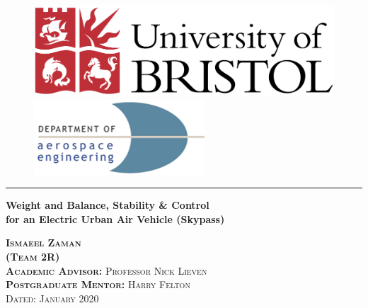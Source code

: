 \documentclass[11pt,a4paper]{article}
\begin{document}
\begin{titlepage}

\begin{figure}[H]
  \includegraphics[width=.75\linewidth]{University_of_Bristol_logo.png}
  \endminipage\hfill
  \centering
    \endminipage\hfill
    \hspace{12mm}
      \includegraphics[width=.75\linewidth]{Aero_logo.png}
      \endminipage
      \end{figure}

\center 
\vspace{20mm}
\hrule

{\Large  \textbf{Weight and Balance, Stability \& Control \\ \vspace{2mm}
for an Electric Urban Air Vehicle (Skypass)}}
\vspace{10mm}

\textsc{\textbf{Ismaeel Zaman}} \\
\textsc{\textbf{(Team 2R)}}\\
\vspace{10mm}
\textsc{\textbf{Academic Advisor:} Professor Nick Lieven} \\
\textsc{\textbf{Postgraduate Mentor:} Harry Felton}
\\[0.5cm]

\vspace{24pt}
\textsc{\large Dated: January 2020} 
\vspace{6pt}


\end{titlepage}
\end{document}
